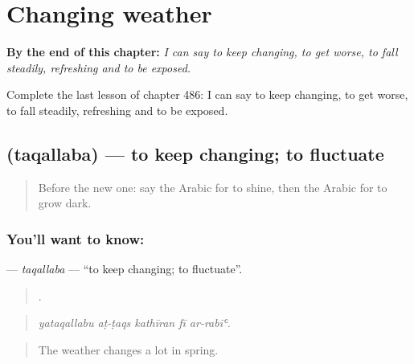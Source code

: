 
\chapter{Changing weather}
\label{ch:ar-changing-weather}

\begin{chapteropening}
\textbf{By the end of this chapter:} \emph{I can say to keep changing, to get worse, to fall steadily, refreshing and to be exposed.}

Complete the last lesson of chapter 486: I can say to keep changing, to get worse, to fall steadily, refreshing and to be exposed.
\end{chapteropening}

\section[\texorpdfstring{\ar{تقلب} (taqallaba)}{تقلب (taqallaba)}]{ (taqallaba) — to keep changing; to fluctuate}

\label{lesson:AR-C486-taqallaba}



\begin{quote}
Before the new one: say the Arabic for to shine, then the Arabic for to grow dark.
\end{quote}

\subsection*{You'll want to know: }
\textbf{} — \emph{taqallaba} — \textquotedblleft{}to keep changing; to fluctuate\textquotedblright{}.

\begin{quote}
    .
\end{quote}

\begin{quote}
\emph{yataqallabu aṭ-ṭaqs kathīran fī ar-rabīʿ.}
\end{quote}

\begin{quote}
The weather changes a lot in spring.
\end{quote}


